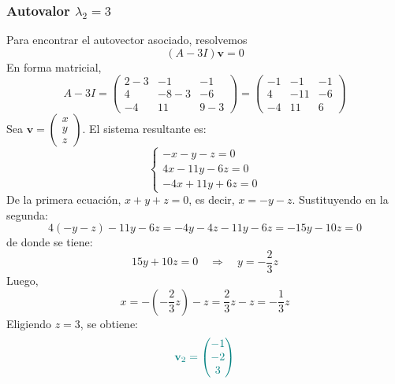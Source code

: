 \documentclass{article}
\begin{document}
\begin{enumerate}[label=\textbf{\alph*)}]
\subsubsection*{Autovalor \( \lambda_2 = 3 \)}
Para encontrar el autovector asociado, resolvemos
\[
(A - 3I)\mathbf{v} = 0
\]
En forma matricial,
\[
A - 3I =
\begin{pmatrix}
2-3 & -1 & -1 \\
4 & -8-3 & -6 \\
-4 & 11 & 9-3
\end{pmatrix}
=
\begin{pmatrix}
-1 & -1 & -1 \\
4 & -11 & -6 \\
-4 & 11 & 6
\end{pmatrix}
\]
Sea \( \mathbf{v} = \begin{pmatrix} x \\ y \\ z \end{pmatrix} \). El sistema resultante es:
\[
\begin{cases}
- x - y - z = 0 \\
4x - 11y - 6z = 0 \\
-4x + 11y + 6z = 0
\end{cases}
\]
De la primera ecuación, \( x + y + z = 0 \), es decir, \( x = -y - z \). Sustituyendo en la segunda:
\[
4(-y - z) - 11y - 6z = -4y - 4z - 11y - 6z = -15y - 10z = 0
\]
de donde se tiene:
\[
15y + 10z = 0 \quad \Longrightarrow \quad y = -\frac{2}{3}z
\]
Luego,
\[
x = -\left(-\frac{2}{3}z\right) - z = \frac{2}{3}z - z = -\frac{1}{3}z
\]
Eligiendo \( z = 3 \), se obtiene:
\[\color{teal}
\mathbf{v}_2 = \begin{pmatrix} -1 \\ -2 \\ 3 \end{pmatrix}
\]


\end{enumerate}
\end{document}
